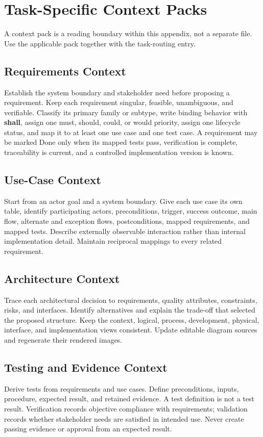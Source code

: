 \section{Task-Specific Context Packs}
A context pack is a reading boundary within this appendix, not a separate file.
Use the applicable pack together with the task-routing entry.

\subsection{Requirements Context}
Establish the system boundary and stakeholder need before proposing a
requirement. Keep each requirement singular, feasible, unambiguous, and
verifiable. Classify its primary family or subtype, write binding behavior with
\textbf{shall}, assign one \gls{must}, \gls{should}, \gls{could}, or
\gls{would} priority, assign one lifecycle status, and map it to at least one
use case and one test case. A requirement may be marked Done only when its
mapped tests pass, verification is complete, traceability is current, and a
controlled implementation version is known.

\subsection{Use-Case Context}
Start from an actor goal and a system boundary. Give each use case its own
table, identify participating actors, preconditions, trigger, success outcome,
main flow, alternate and exception flows, postconditions, mapped requirements,
and mapped tests. Describe externally observable interaction rather than
internal implementation detail. Maintain reciprocal mappings to every related
requirement.

\subsection{Architecture Context}
Trace each architectural decision to requirements, quality attributes,
constraints, risks, and interfaces. Identify alternatives and explain the
trade-off that selected the proposed structure. Keep the context, logical,
process, development, physical, interface, and implementation views consistent.
Update editable diagram sources and regenerate their rendered images.

\subsection{Testing and Evidence Context}
Derive tests from requirements and use cases. Define preconditions, inputs,
procedure, expected result, and retained evidence. A test definition is not a
test result. Verification records objective compliance with requirements;
validation records whether stakeholder needs are satisfied in intended use.
Never create passing evidence or approval from an expected result.


